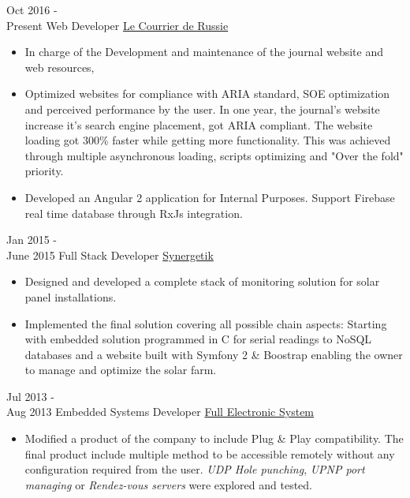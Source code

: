 \documentclass[a4paper]{template} %
\begin{document}
\begin{twenty} %
    \twentyitem
   		{Oct 2016 - \\ Present}
        {Web Developer}
        {\href{http://www.lecourrierderussie.com}{Le Courrier de Russie}}
        {}
        {
        {\begin{itemize}
        \item In charge of the Development and maintenance of the journal website and web resources,
        \item Optimized websites for compliance with ARIA standard, SOE optimization and perceived performance by the user. In one year, the journal's website increase it's search engine placement, got ARIA compliant. The website loading got 300\% faster while getting more functionality. This was achieved through multiple asynchronous loading, scripts optimizing and "Over the fold" priority.
        \item Developed an Angular 2 application for Internal Purposes. Support Firebase real time database through RxJs integration.
    \end{itemize}}
        }

     \twentyitem
   		{Jan 2015 - \\ June 2015}
        {Full Stack Developer}
        {\href{http://synergetik.fr/}{Synergetik}}
        {}
        {
        \begin{itemize}
        \item Designed and developed a complete stack of monitoring solution for solar panel installations.
        \item Implemented the final solution covering all possible chain aspects: Starting with embedded solution programmed in C for serial readings to NoSQL databases and a website built with Symfony 2 \& Boostrap enabling the owner to manage and optimize the solar farm.
    \end{itemize}
    	}

    	\twentyitem
   		{Jul 2013 - \\ Aug 2013}
        {Embedded Systems Developer}
        {\href{http://www.fesys.fr/fr}{Full Electronic System}}
        {}
        {
        \begin{itemize}
        \item Modified a product of the company to include Plug \& Play compatibility. The final product include multiple method to be accessible remotely without any configuration required from the user. \textit{UDP Hole punching}, \textit{UPNP port managing} or \textit{Rendez-vous servers} were explored and tested.
    \end{itemize}
    	}

\end{twenty}
\end{document}
